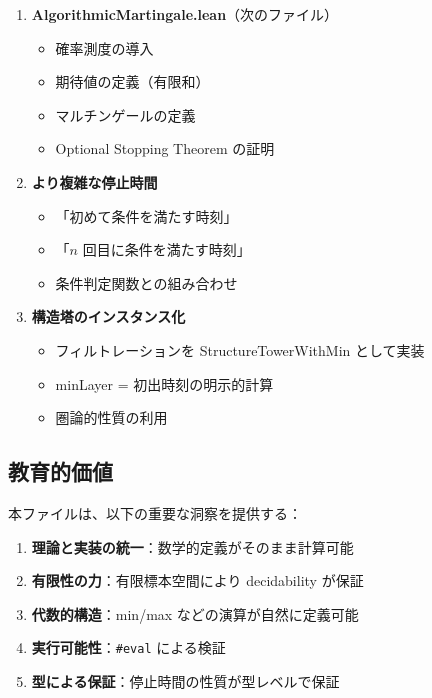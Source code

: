 \documentclass[12pt,a4paper,ja=standard]{bxjsarticle}
\theoremstyle{definition}
\begin{document}
\begin{enumerate}
    \item \textbf{AlgorithmicMartingale.lean}（次のファイル）
    \begin{itemize}
        \item 確率測度の導入
        \item 期待値の定義（有限和）
        \item マルチンゲールの定義
        \item Optional Stopping Theorem の証明
    \end{itemize}
    
    \item \textbf{より複雑な停止時間}
    \begin{itemize}
        \item 「初めて条件を満たす時刻」
        \item 「$n$ 回目に条件を満たす時刻」
        \item 条件判定関数との組み合わせ
    \end{itemize}
    
    \item \textbf{構造塔のインスタンス化}
    \begin{itemize}
        \item フィルトレーションを StructureTowerWithMin として実装
        \item minLayer = 初出時刻の明示的計算
        \item 圏論的性質の利用
    \end{itemize}
\end{enumerate}

\subsection{教育的価値}

\begin{insight}
本ファイルは、以下の重要な洞察を提供する：

\begin{enumerate}
    \item \textbf{理論と実装の統一}：数学的定義がそのまま計算可能
    \item \textbf{有限性の力}：有限標本空間により decidability が保証
    \item \textbf{代数的構造}：min/max などの演算が自然に定義可能
    \item \textbf{実行可能性}：\texttt{\#eval} による検証
    \item \textbf{型による保証}：停止時間の性質が型レベルで保証
\end{enumerate}
\end{insight}
\end{document}

